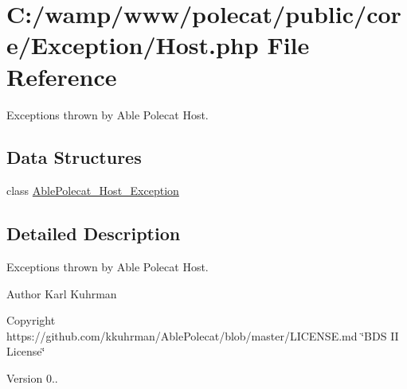 \hypertarget{_exception_2_host_8php}{}\section{C\+:/wamp/www/polecat/public/core/\+Exception/\+Host.php File Reference}
\label{_exception_2_host_8php}


Exceptions thrown by Able Polecat Host.  


\subsection*{Data Structures}
\begin{DoxyCompactItemize}
\item 
class \hyperlink{class_able_polecat___host___exception}{Able\+Polecat\+\_\+\+Host\+\_\+\+Exception}
\end{DoxyCompactItemize}


\subsection{Detailed Description}
Exceptions thrown by Able Polecat Host. 

\begin{DoxyAuthor}{Author}
Karl Kuhrman 
\end{DoxyAuthor}
\begin{DoxyCopyright}{Copyright}
https\+://github.com/kkuhrman/\+Able\+Polecat/blob/master/\+L\+I\+C\+E\+N\+S\+E.\+md \char`\"{}\+B\+D\+S I\+I License\char`\"{} 
\end{DoxyCopyright}
\begin{DoxyVersion}{Version}
0.. 
\end{DoxyVersion}
